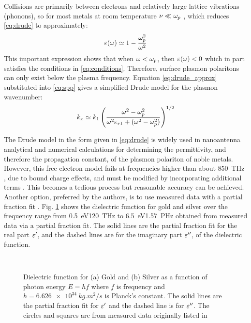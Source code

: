\documentclass[11pt]{article}
\begin{document}
Collisions are primarily between electrons and relatively large lattice vibrations (phonons), so for most metals at room temperature  $\nu \ll \omega_p $ \cite{Bohren1998}, which reduces \eqref{eq:drude} to approximately:
%
\begin{equation}
  \varepsilon(\omega) \simeq 1 - \frac{\omega_p^2}{\omega^2}
  \label{eq:drude_approx}
\end{equation}
%
This important expression shows that when $\omega < \omega_p$, then $\varepsilon(\omega) < 0$  which in part satisfies the conditions in \eqref{eq:conditions}. Therefore, surface plasmon polaritons can only exist below the plasma frequency. Equation \eqref{eq:drude_approx} substituted into \eqref{eq:spp} gives a simplified Drude model for the plasmon wavenumber:
%
\begin{equation}
  k_x \simeq k_1 \left( \frac{\omega^2 - \omega_p^2}{\omega^2 \varepsilon_{r1} + (\omega^2 - \omega_p^2)} \right)^{1/2}
  \label{eq:kx_approx}
\end{equation}
%

The Drude model in the form given in \eqref{eq:drude} is widely used in nanoantenna analytical and numerical calculations for determining the permittivity, and therefore the propagation constant, of the plasmon polariton of noble metals. However, this free electron model fails at frequencies higher than about \SI{850}{\tera\Hz} \cite{Archambault2009}, due to bound charge effects, and must be modified by incorporating additional terms \cite{Bohren1998}. This becomes a tedious process but reasonable accuracy can be achieved. Another option, preferred by the authors, is to use measured data \cite{Lynch1997} with a partial fraction fit \cite{Michalski2013}. Fig. \ref{fig:permittivity} shows the dielectric function for gold and silver over the frequency range from \SI{.5}{\electronvolt}\texttildelow \SI{120}{\THz} to \SI{6.5}{\electronvolt}\texttildelow \SI{1.57}{\peta \Hz} obtained from measured data via a partial fraction fit. The solid lines are the
partial fraction fit for the real part $\varepsilon'$, and the dashed lines are for the imaginary part $\varepsilon''$, of the dielectric function.
%
\begin{figure}[t!]
  \centering
   \\
  \caption{Dielectric function for (a) Gold and (b) Silver as a function of  photon energy $E = hf$ where $f$ is frequency and $h = \SI{6.626e34} {kg.m^{2}/s}$ is Planck's constant. The solid lines are the partial fraction fit for $\varepsilon'$ and the dashed line is for $\varepsilon''$. The circles and squares are from measured data originally listed in \cite{Johnson1972}}
  \label{fig:permittivity}
\end{figure}
%
\end{document}
